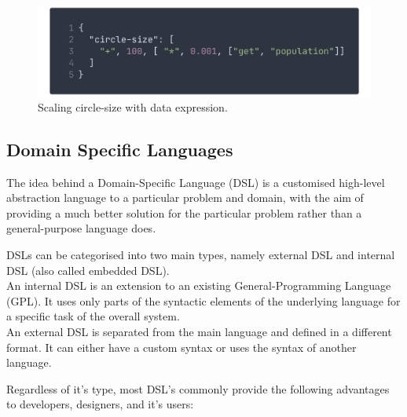 \documentclass[conference]{IEEEtran}
\begin{document}
\begin{figure}
    \centering
    \includegraphics[width=\columnwidth]{img/circlesize.png}
    \caption{Scaling circle-size with data expression.}
    \label{fig:exp1}
\end{figure}





\subsection{Domain Specific Languages}

The idea behind a Domain-Specific Language (DSL) is a customised high-level abstraction language to a particular problem and domain, with the aim of providing a much better solution for the particular problem rather than a general-purpose language does\cite{van2000domain}.


DSLs can be categorised into two main types, namely  external DSL and internal DSL (also called embedded DSL).  
\\
An internal DSL is an extension to an existing General-Programming Language (GPL). It uses only parts of the syntactic elements
of the underlying language for a specific task of the overall system\cite{fowler2010domain}. 
\\
An external DSL is separated from the main language and defined in a different format. It can either have a custom syntax or uses the syntax of another language\cite{zdun2010dsl}.

Regardless of it's type, most DSL's commonly provide the following advantages to developers, designers, and it's users:
\end{document}
